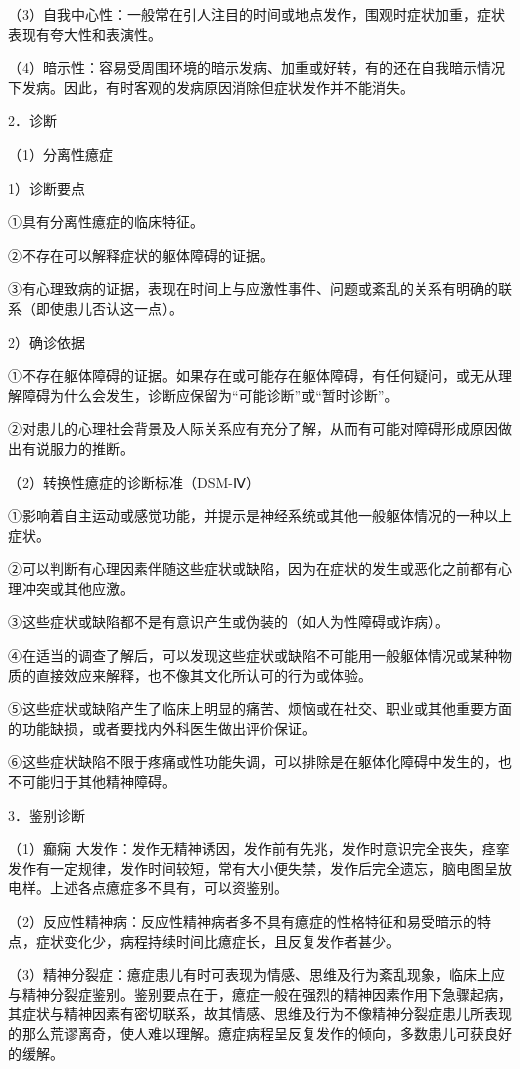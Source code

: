 （3）自我中心性：一般常在引人注目的时间或地点发作，围观时症状加重，症状表现有夸大性和表演性。

（4）暗示性：容易受周围环境的暗示发病、加重或好转，有的还在自我暗示情况下发病。因此，有时客观的发病原因消除但症状发作并不能消失。

2．诊断

（1）分离性癔症

1）诊断要点

①具有分离性癔症的临床特征。

②不存在可以解释症状的躯体障碍的证据。

③有心理致病的证据，表现在时间上与应激性事件、问题或紊乱的关系有明确的联系（即使患儿否认这一点）。

2）确诊依据

①不存在躯体障碍的证据。如果存在或可能存在躯体障碍，有任何疑问，或无从理解障碍为什么会发生，诊断应保留为“可能诊断”或“暂时诊断”。

②对患儿的心理社会背景及人际关系应有充分了解，从而有可能对障碍形成原因做出有说服力的推断。

（2）转换性癔症的诊断标准（DSM-Ⅳ）

①影响着自主运动或感觉功能，并提示是神经系统或其他一般躯体情况的一种以上症状。

②可以判断有心理因素伴随这些症状或缺陷，因为在症状的发生或恶化之前都有心理冲突或其他应激。

③这些症状或缺陷都不是有意识产生或伪装的（如人为性障碍或诈病）。

④在适当的调查了解后，可以发现这些症状或缺陷不可能用一般躯体情况或某种物质的直接效应来解释，也不像其文化所认可的行为或体验。

⑤这些症状或缺陷产生了临床上明显的痛苦、烦恼或在社交、职业或其他重要方面的功能缺损，或者要找内外科医生做出评价保证。

⑥这些症状缺陷不限于疼痛或性功能失调，可以排除是在躯体化障碍中发生的，也不可能归于其他精神障碍。

3．鉴别诊断

（1）癫痫
大发作：发作无精神诱因，发作前有先兆，发作时意识完全丧失，痉挛发作有一定规律，发作时间较短，常有大小便失禁，发作后完全遗忘，脑电图呈放电样。上述各点癔症多不具有，可以资鉴别。

（2）反应性精神病：反应性精神病者多不具有癔症的性格特征和易受暗示的特点，症状变化少，病程持续时间比癔症长，且反复发作者甚少。

（3）精神分裂症：癔症患儿有时可表现为情感、思维及行为紊乱现象，临床上应与精神分裂症鉴别。鉴别要点在于，癔症一般在强烈的精神因素作用下急骤起病，其症状与精神因素有密切联系，故其情感、思维及行为不像精神分裂症患儿所表现的那么荒谬离奇，使人难以理解。癔症病程呈反复发作的倾向，多数患儿可获良好的缓解。

